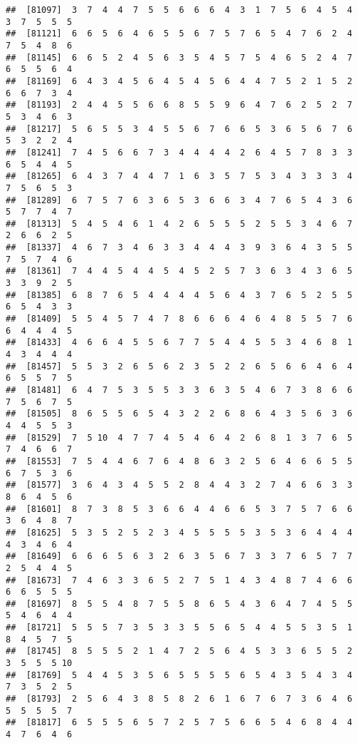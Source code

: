 \documentclass[
]{book}
\begin{document}
\begin{verbatim}
##  [81097]  3  7  4  4  7  5  5  6  6  6  4  3  1  7  5  6  4  5  4  3  7  5  5  5
##  [81121]  6  6  5  6  4  6  5  5  6  7  5  7  6  5  4  7  6  2  4  7  5  4  8  6
##  [81145]  6  6  5  2  4  5  6  3  5  4  5  7  5  4  6  5  2  4  7  6  5  5  6  4
##  [81169]  6  4  3  4  5  6  4  5  4  5  6  4  4  7  5  2  1  5  2  6  6  7  3  4
##  [81193]  2  4  4  5  5  6  6  8  5  5  9  6  4  7  6  2  5  2  7  5  3  4  6  3
##  [81217]  5  6  5  5  3  4  5  5  6  7  6  6  5  3  6  5  6  7  6  5  3  2  2  4
##  [81241]  7  4  5  6  6  7  3  4  4  4  4  2  6  4  5  7  8  3  3  6  5  4  4  5
##  [81265]  6  4  3  7  4  4  7  1  6  3  5  7  5  3  4  3  3  3  4  7  5  6  5  3
##  [81289]  6  7  5  7  6  3  6  5  3  6  6  3  4  7  6  5  4  3  6  5  7  7  4  7
##  [81313]  5  4  5  4  6  1  4  2  6  5  5  5  2  5  5  3  4  6  7  2  6  6  2  5
##  [81337]  4  6  7  3  4  6  3  3  4  4  4  3  9  3  6  4  3  5  5  7  5  7  4  6
##  [81361]  7  4  4  5  4  4  5  4  5  2  5  7  3  6  3  4  3  6  5  3  3  9  2  5
##  [81385]  6  8  7  6  5  4  4  4  4  5  6  4  3  7  6  5  2  5  5  6  5  4  3  3
##  [81409]  5  5  4  5  7  4  7  8  6  6  6  4  6  4  8  5  5  7  6  6  4  4  4  5
##  [81433]  4  6  6  4  5  5  6  7  7  5  4  4  5  5  3  4  6  8  1  4  3  4  4  4
##  [81457]  5  5  3  2  6  5  6  2  3  5  2  2  6  5  6  6  4  6  4  6  5  5  7  5
##  [81481]  6  4  7  5  3  5  5  3  3  6  3  5  4  6  7  3  8  6  6  7  5  6  7  5
##  [81505]  8  6  5  5  6  5  4  3  2  2  6  8  6  4  3  5  6  3  6  4  4  5  5  3
##  [81529]  7  5 10  4  7  7  4  5  4  6  4  2  6  8  1  3  7  6  5  7  4  6  6  7
##  [81553]  7  5  4  4  6  7  6  4  8  6  3  2  5  6  4  6  6  5  5  6  7  5  3  6
##  [81577]  3  6  4  3  4  5  5  2  8  4  4  3  2  7  4  6  6  3  3  8  6  4  5  6
##  [81601]  8  7  3  8  5  3  6  6  4  4  6  6  5  3  7  5  7  6  6  3  6  4  8  7
##  [81625]  5  3  5  2  5  2  3  4  5  5  5  5  3  5  3  6  4  4  4  4  3  4  6  4
##  [81649]  6  6  6  5  6  3  2  6  3  5  6  7  3  3  7  6  5  7  7  2  5  4  4  5
##  [81673]  7  4  6  3  3  6  5  2  7  5  1  4  3  4  8  7  4  6  6  6  6  5  5  5
##  [81697]  8  5  5  4  8  7  5  5  8  6  5  4  3  6  4  7  4  5  5  5  4  6  4  4
##  [81721]  5  5  5  7  3  5  3  3  5  5  6  5  4  4  5  5  3  5  1  8  4  5  7  5
##  [81745]  8  5  5  5  2  1  4  7  2  5  6  4  5  3  3  6  5  5  2  3  5  5  5 10
##  [81769]  5  4  4  5  3  5  6  5  5  5  5  6  5  4  3  5  4  3  4  7  3  5  2  5
##  [81793]  2  5  6  4  3  8  5  8  2  6  1  6  7  6  7  3  6  4  6  5  5  5  5  7
##  [81817]  6  5  5  5  6  5  7  2  5  7  5  6  6  5  4  6  8  4  4  4  7  6  4  6

\end{verbatim}
\end{document}
